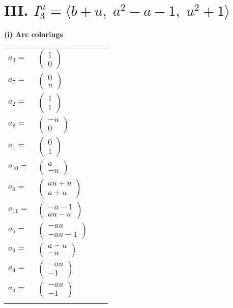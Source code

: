 \documentclass[1p]{elsarticle_modified}
\theoremstyle{definition}
\begin{document}
\centering \section*{III. $I^u_{3}= \langle b+u,\;a^2- a-1,\;u^2+1 \rangle$}
\flushleft \textbf{(i) Arc colorings}\\
\begin{tabular}{m{7pt} m{180pt} m{7pt} m{180pt} }
\flushright $a_{3}=$&$\begin{pmatrix}1\\0\end{pmatrix}$ \\
\flushright $a_{7}=$&$\begin{pmatrix}0\\u\end{pmatrix}$ \\
\flushright $a_{2}=$&$\begin{pmatrix}1\\1\end{pmatrix}$ \\
\flushright $a_{8}=$&$\begin{pmatrix}- u\\0\end{pmatrix}$ \\
\flushright $a_{1}=$&$\begin{pmatrix}0\\1\end{pmatrix}$ \\
\flushright $a_{10}=$&$\begin{pmatrix}a\\- u\end{pmatrix}$ \\
\flushright $a_{6}=$&$\begin{pmatrix}a u+u\\a+u\end{pmatrix}$ \\
\flushright $a_{11}=$&$\begin{pmatrix}- a-1\\a u- a\end{pmatrix}$ \\
\flushright $a_{5}=$&$\begin{pmatrix}- a u\\- a u-1\end{pmatrix}$ \\
\flushright $a_{9}=$&$\begin{pmatrix}a- u\\- u\end{pmatrix}$ \\
\flushright $a_{4}=$&$\begin{pmatrix}- a u\\-1\end{pmatrix}$\\ \flushright $a_{4}=$&$\begin{pmatrix}- a u\\-1\end{pmatrix}$\\&\end{tabular}
\end{document}
